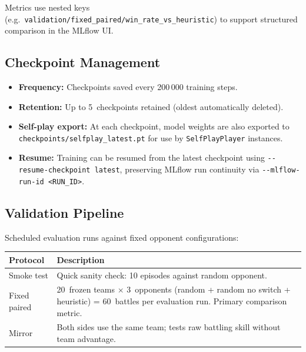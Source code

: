 Metrics use nested keys (e.g.\
\texttt{validation/fixed\_paired/win\_rate\_vs\_heuristic}) to support
structured comparison in the MLflow UI.


\subsection{Checkpoint Management}

\begin{itemize}
  \item \textbf{Frequency:} Checkpoints saved every 200\,000 training steps.
  \item \textbf{Retention:} Up to 5~checkpoints retained (oldest automatically
        deleted).
  \item \textbf{Self-play export:} At each checkpoint, model weights are also
        exported to \texttt{checkpoints/selfplay\_latest.pt} for use by
        \texttt{SelfPlayPlayer} instances.
  \item \textbf{Resume:} Training can be resumed from the latest checkpoint
        using \texttt{-{}-resume-checkpoint latest}, preserving MLflow run
        continuity via \texttt{-{}-mlflow-run-id <RUN\_ID>}.
\end{itemize}

\subsection{Validation Pipeline}

Scheduled evaluation runs against fixed opponent configurations:

\begin{center}
\small
\begin{tabularx}{\textwidth}{l X}
  \toprule
  \textbf{Protocol} & \textbf{Description} \\
  \midrule
  Smoke test     & Quick sanity check: 10 episodes against random opponent. \\
  Fixed paired   & 20~frozen teams $\times$ 3~opponents (random + random no switch + heuristic) =
                   60~battles per evaluation run.  Primary comparison metric. \\
  Mirror         & Both sides use the same team; tests raw battling skill
                   without team advantage. \\
  \bottomrule
\end{tabularx}
\end{center}

